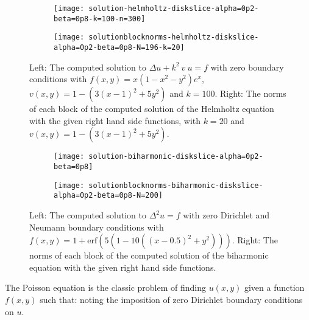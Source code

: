 \begin{figure}[t]
	\begin{subfigure}{0.3\textwidth}
	\centering
	\texttt{[image: solution-helmholtz-diskslice-alpha=0p2-beta=0p8-k=100-n=300]}
	\end{subfigure}
	\begin{subfigure}{0.5\textwidth}
	\texttt{[image: solutionblocknorms-helmholtz-diskslice-alpha=0p2-beta=0p8-N=196-k=20]}
	\centering
	\end{subfigure}
	\caption{Left: The computed solution to $\Delta u + k^2 \: v \: u = f$ with zero boundary conditions with $f(x,y) = x(1-x^2-y^2)e^x$, $v(x,y) = 1 - (3(x-1)^2 + 5y^2)$ and $k = 100$. Right: The norms of each block of the computed solution of the Helmholtz equation with the given right hand side functions, with $k=20$ and $v(x,y) = 1 - (3(x-1)^2 + 5y^2)$.}
	\centering
	\label{fig:ds:helmholtz}
\end{figure}

\begin{figure}[t]
	\begin{subfigure}{0.3\textwidth}
	\centering
	\texttt{[image: solution-biharmonic-diskslice-alpha=0p2-beta=0p8]}
	\end{subfigure}
	\begin{subfigure}{0.5\textwidth}
	\texttt{[image: solutionblocknorms-biharmonic-diskslice-alpha=0p2-beta=0p8-N=200]}
	\centering
	\end{subfigure}
	\caption{Left: The computed solution to $\Delta^2 u = f$ with zero Dirichlet and Neumann boundary conditions with $f(x,y) = 1 + \text{erf}(5(1 - 10((x - 0.5)^2 + y^2)))$. Right: The norms of each block of the computed solution of the biharmonic equation with the given right hand side functions.}
	\centering
	\label{fig:ds:biharmonic}
\end{figure}

The Poisson equation is the classic problem of finding $u(x,y)$ given a function $f(x,y)$ such that:
noting the imposition of zero Dirichlet boundary conditions on $u$.

